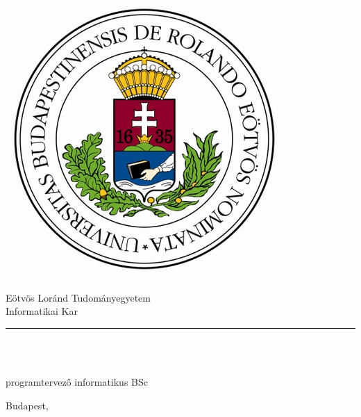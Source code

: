 \begin{titlepage}

\begin{minipage}{0.40\linewidth}
\includegraphics[scale=0.3]{img/elte-cimer}
\end{minipage}
\begin{minipage}{0.50\linewidth}
\begin{center}
Eötvös Loránd Tudományegyetem \\
Informatikai Kar \\
\TANSZEK
\end{center}
\end{minipage}

\hrule
\vfill

\begin{center}
\Huge
\textbf{\CIM}
\normalsize
\end{center}

\vfill

\begin{minipage}[t]{0.5\linewidth}
\begin{flushleft}
\textbf{\TEMAVEZETO} \\
\TEMAVEZETOBEOSZTAS
\end{flushleft}
\end{minipage}
\begin{minipage}[t]{0.5\linewidth}
\begin{flushright}
\textbf{\SZERZO} \\
programtervező informatikus BSc
\end{flushright}
\end{minipage}

\vfill

\begin{center}
Budapest, \VEDESEVE
\end{center}

\end{titlepage}
